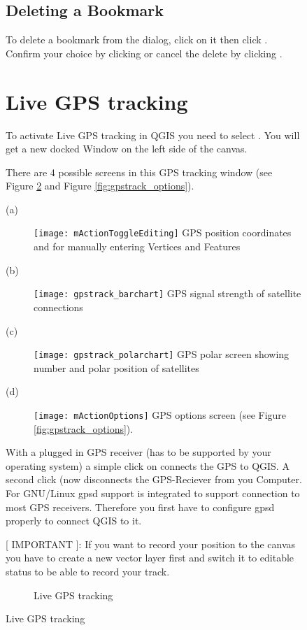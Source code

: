 \begin{figure}[ht]
\subsection{Deleting a Bookmark}
To delete a bookmark from the 
dialog, click on it then click .
Confirm your choice by clicking  or cancel the
delete by clicking .

\section{Live GPS tracking}\label{sec:gpstracking}

To activate Live GPS tracking in QGIS you need to select
 \arrow {}. You will get a new
docked Window on the left side of the canvas.

There are 4 possible screens in this GPS tracking window
(see Figure \ref{fig:gpstrack_live} and Figure \ref{fig:gpstrack_options}).

\begin{description}
 \item[(a)] \texttt{[image: mActionToggleEditing]}
GPS position coordinates and for manually entering Vertices and Features
 \item[(b)] \texttt{[image: gpstrack\_barchart]}
GPS signal strength of satellite connections
 \item[(c)] \texttt{[image: gpstrack\_polarchart]}
GPS polar screen showing number and polar position of satellites
 \item[(d)] \texttt{[image: mActionOptions]}
GPS options screen (see Figure \ref{fig:gpstrack_options}).
\end{description}

With a plugged in GPS receiver (has to be supported by your operating system)
a simple click on  connects the GPS to QGIS. A second click
(now  disconnects the GPS-Reciever from you Computer. For 
GNU/Linux gpsd support is integrated to support connection to most GPS 
receivers. Therefore you first have to configure gpsd properly to connect QGIS to it.

[ IMPORTANT ]: If you want to record your position to the canvas you have to
create a new vector layer first and switch it to editable status to be able
to record your track.

\begin{figure}[ht]
\centering
     \hspace{0.33cm}
     \hspace{0.33cm}
\caption{Live GPS tracking \nixcaption} \label{fig:gpstrack_live}
\end{figure}


\end{figure}
